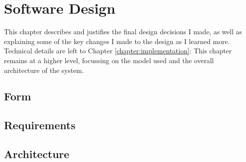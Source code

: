 \chapter{Software Design}
\label{chapter:design}
  This chapter describes and justifies the final design decisions I made, as well as explaining some of the key changes I made to the design as I learned more. Technical details are left to Chapter \ref{chapter:implementation}: This chapter remains at a higher level, focussing on the model used and the overall architecture of the system.

  \section{Form}
  \section{Requirements}
    \todo{\item}

  \section{Architecture}
